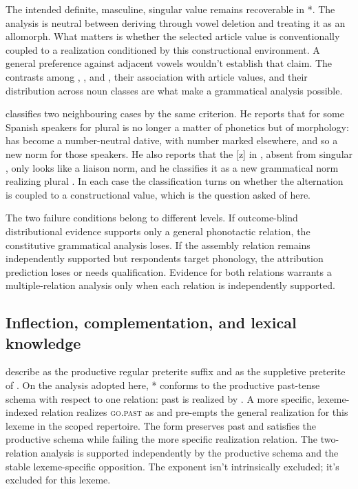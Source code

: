 \documentclass[12pt,letterpaper]{article}
\begin{document}
The intended definite, masculine, singular value remains recoverable in
*. The analysis is neutral between deriving  through
vowel deletion and treating it as an allomorph. What matters is whether the
selected article value is conventionally coupled to a realization conditioned
by this constructional environment. A general preference against adjacent
vowels wouldn't establish that claim. The contrasts among ,
, and , their association with article values, and their
distribution across noun classes are what make a grammatical analysis possible.

\textcite[89--90]{coseriu2019} classifies two neighbouring cases by the same
criterion. He reports that for some Spanish speakers  for plural
 is no longer a matter of phonetics but of morphology:  has
become a number-neutral dative, with number marked elsewhere, and so a new norm
for those speakers. He also reports that the [z] in ,
absent from singular , only looks like a liaison norm, and
he classifies it as a new grammatical norm realizing plural
\citep[p.~90, n.~67]{coseriu2019}. In each case the classification turns on whether
the alternation is coupled to a constructional value, which is the question asked
of  here.

The two failure conditions belong to different levels. If outcome-blind
distributional evidence supports only a general phonotactic relation, the
constitutive grammatical analysis loses. If the assembly relation remains
independently supported but respondents target phonology, the attribution
prediction loses or needs qualification. Evidence for both relations warrants a
multiple-relation analysis only when each relation is independently supported.

\subsection{Inflection, complementation, and lexical knowledge}
\label{sec:lexical-cases}

\textcite[1596--1598, 1607]{huddleston2002} describe  as the
productive regular preterite suffix and  as the suppletive preterite
of . On the analysis adopted here, * conforms to the
productive past-tense schema with respect to one relation: past is realized by
. A more specific, lexeme-indexed relation realizes
\textsc{go.past} as  and pre-empts the general realization for this
lexeme in the scoped repertoire. The form preserves past and satisfies
the productive schema while failing the more specific realization relation. The
two-relation analysis is supported independently by the productive schema and the
stable lexeme-specific opposition. The exponent isn't intrinsically excluded;
it's excluded for this lexeme.
\end{document}
